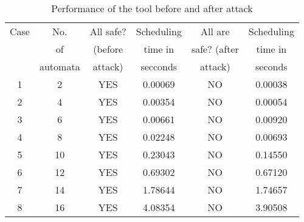 \begin{table}[ht]
\caption{Performance of the tool before and after attack}
\centering
\begin{tabular}{|c | c | c | c | c | c|}
\hline %
Case & No.           &  All safe?       & Scheduling   & All are       &Scheduling  \\       
     & of            &  (before   & time in      & safe? (after   &time in            \\  
     & automata      &  attack)        & secconds     & attack)      &seconds    \\
\hline
\hline
1 & 2 & YES & 0.00069 & NO & 0.00038\\

2 & 4  & YES & 0.00354 & NO &  0.00054 \\

3 & 6  & YES & 0.00661 & NO & 0.00920 \\

4 & 8 & YES &  0.02248 & NO & 0.00693 \\

5 & 10 & YES & 0.23043 & NO & 0.14550 \\

6 & 12 & YES & 0.69302 & NO & 0.67120 \\

7 & 14 & YES & 1.78644 & NO & 1.74657 \\

8 & 16 & YES & 4.08354 & NO & 3.90508 \\

\hline

\end{tabular}
\label{table:nonlin}

\end{table}

